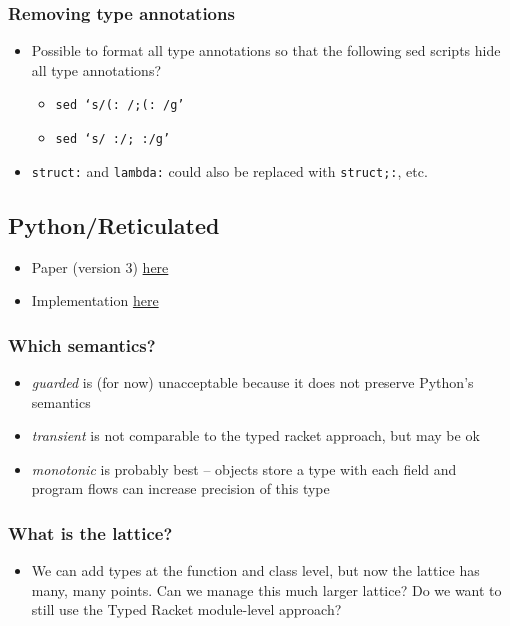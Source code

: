 \documentclass[11pt]{article}
\begin{document}
\subsubsection{Removing type annotations}
\label{sec-1-2-2}

\begin{itemize}
\item Possible to format all type annotations so that the following sed scripts hide all type annotations?
\begin{itemize}
\item \texttt{sed `s/(: /;(: /g'}
\item \texttt{sed `s/ :/; :/g'}
\end{itemize}
\item \texttt{struct:} and \texttt{lambda:} could also be replaced with \texttt{struct;:}, etc.
\end{itemize}
\subsection{Python/Reticulated}
\label{sec-1-3}

\begin{itemize}
\item Paper (version 3) \href{http://wphomes.soic.indiana.edu/jsiek/files/2014/08/retic-python-v3.pdf}{here}
\item Implementation \href{https://github.com/mvitousek/reticulated}{here}
\end{itemize}
\subsubsection{Which semantics?}
\label{sec-1-3-1}

\begin{itemize}
\item \emph{guarded} is (for now) unacceptable because it does not preserve Python's semantics
\item \emph{transient} is not comparable to the typed racket approach, but may be ok
\item \emph{monotonic} is probably best -- objects store a type with each field and program flows can increase precision of this type
\end{itemize}
\subsubsection{What is the lattice?}
\label{sec-1-3-2}

\begin{itemize}
\item We can add types at the function and class level, but now the lattice has many, many points.
    Can we manage this much larger lattice?
    Do we want to still use the Typed Racket module-level approach?
\end{itemize}
\end{document}
